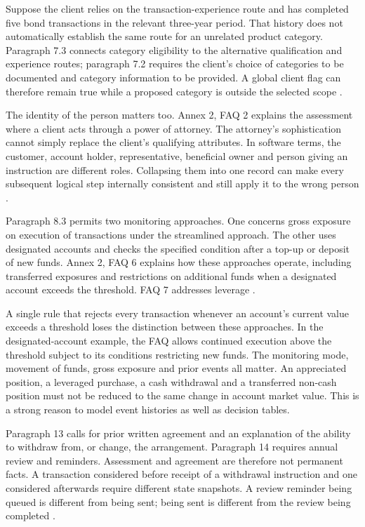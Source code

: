 Suppose the client relies on the transaction-experience route and has completed
five bond transactions in the relevant three-year period. That history does not
automatically establish the same route for an unrelated product category.
Paragraph 7.3 connects category eligibility to the alternative qualification and
experience routes; paragraph 7.2 requires the client's choice of categories to be
documented and category information to be provided. A global client flag can
therefore remain true while a proposed category is outside the selected scope
\citep[Annex 1, paras.~4.1, 7.1--7.3]{sfcspiannex1}.

The identity of the person matters too. Annex 2, FAQ 2 explains the assessment
where a client acts through a power of attorney. The attorney's sophistication
cannot simply replace the client's qualifying attributes. In software terms,
the customer, account holder, representative, beneficial owner and person giving
an instruction are different roles. Collapsing them into one record can make
every subsequent logical step internally consistent and still apply it to the
wrong person \citep[Annex 2, FAQ 2]{sfcspiannex2}.

Paragraph 8.3 permits two monitoring approaches. One concerns gross exposure on
execution of transactions under the streamlined approach. The other uses
designated accounts and checks the specified condition after a top-up or deposit
of new funds. Annex 2, FAQ 6 explains how these approaches operate, including
transferred exposures and restrictions on additional funds when a designated
account exceeds the threshold. FAQ 7 addresses leverage
\citep[Annex 1, para.~8.3; Annex 2, FAQs 6--7]{sfcspiannex1,sfcspiannex2}.

A single rule that rejects every transaction whenever an account's current value
exceeds a threshold loses the distinction between these approaches. In the
designated-account example, the FAQ allows continued execution above the
threshold subject to its conditions restricting new funds. The monitoring mode,
movement of funds, gross exposure and prior events all matter. An appreciated
position, a leveraged purchase, a cash withdrawal and a transferred non-cash
position must not be reduced to the same change in account market value. This is
a strong reason to model event histories as well as decision tables.

Paragraph 13 calls for prior written agreement and an explanation of the ability
to withdraw from, or change, the arrangement. Paragraph 14 requires annual review
and reminders. Assessment and agreement are therefore not permanent facts. A
transaction considered before receipt of a withdrawal instruction and one
considered afterwards require different state snapshots. A review reminder being
queued is different from being sent; being sent is different from the review
being completed \citep[Annex 1, paras.~12--14]{sfcspiannex1}.

